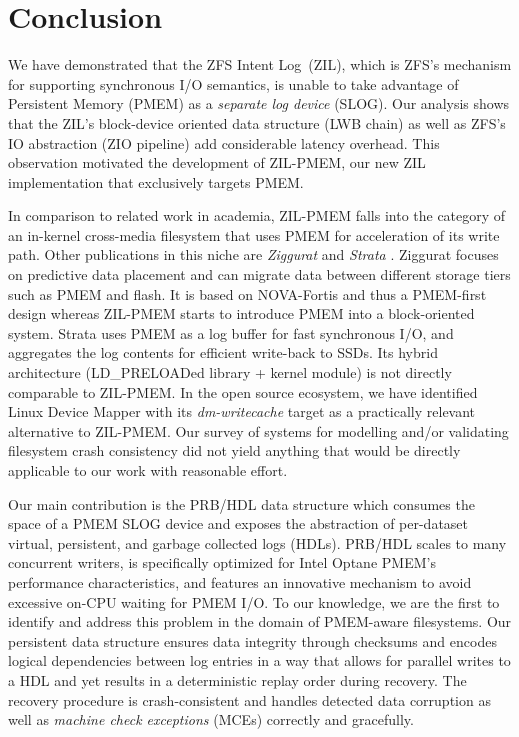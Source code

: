 \documentclass[12pt,a4paper,twoside]{book}
\begin{document}
\chapter{Conclusion}\label{ch:conclusion}

We have demonstrated that the ZFS Intent Log~(ZIL), which is ZFS's mechanism for supporting synchronous I/O semantics, is unable to take advantage of Persistent Memory (PMEM) as a \textit{separate log device} (SLOG).
Our analysis shows that the ZIL's block-device oriented data structure (LWB chain) as well as ZFS's IO abstraction (ZIO pipeline) add considerable latency overhead.
This observation motivated the development of ZIL-PMEM, our new ZIL implementation that exclusively targets PMEM.

In comparison to related work in academia, ZIL-PMEM falls into the category of an in-kernel cross-media filesystem that uses PMEM for acceleration of its write path.
Other publications in this niche are \textit{Ziggurat} and \textit{Strata} \cite{zhengZigguratTieredFile2019,kwonStrataCrossMedia2017}.
Ziggurat focuses on predictive data placement and can migrate data between different storage tiers such as PMEM and flash.
It is based on NOVA-Fortis and thus a PMEM-first design whereas ZIL-PMEM starts to introduce PMEM into a block-oriented system.
Strata uses PMEM as a log buffer for fast synchronous I/O, and aggregates the log contents for efficient write-back to SSDs.
Its hybrid architecture (LD\_PRELOADed library + kernel module) is not directly comparable to ZIL-PMEM.
In the open source ecosystem, we have identified Linux Device Mapper with its \textit{dm-writecache} target as a practically relevant alternative to \mbox{ZIL-PMEM}.
Our survey of systems for modelling and/or validating filesystem crash consistency did not yield anything that would be directly applicable to our work with reasonable effort.

Our main contribution is the PRB/HDL data structure which consumes the space of a PMEM SLOG device and exposes the abstraction of per-dataset virtual, persistent, and garbage collected logs (HDLs).
PRB/HDL scales to many concurrent writers, is specifically optimized for Intel Optane PMEM's performance characteristics, and features an innovative mechanism to avoid excessive on-CPU waiting for PMEM I/O.
To our knowledge, we are the first to identify and address this problem in the domain of PMEM-aware filesystems.
Our persistent data structure ensures data integrity through checksums and encodes logical dependencies between log entries in a way that allows for parallel writes to a HDL and yet results in a deterministic replay order during recovery.
The recovery procedure is crash-consistent and handles detected data corruption as well as \textit{machine check exceptions} (MCEs) correctly and gracefully.
\end{document}
